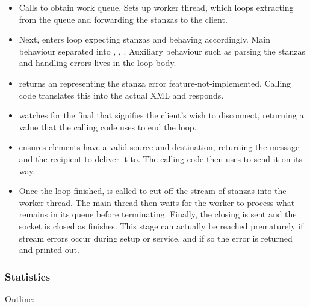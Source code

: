 \documentclass[12pt,a4paper,twoside,openright]{report}
\begin{document}
{\begin{itemize}
  \item Calls  to obtain work queue. Sets up worker thread, which loops extracting from the queue and forwarding the stanzas to the client.

  \item Next, enters loop expecting stanzas and behaving accordingly. Main behaviour separated into , , . Auxiliary behaviour such as parsing the stanzas and handling errors lives in the loop body.

  \item {} returns an  representing the stanza error feature-not-implemented. Calling code translates this into the actual XML and responds.

  \item {} watches for the final  that signifies the client's wish to disconnect, returning a value that the calling code uses to end the loop.

  \item {} ensures  elements have a valid source and destination, returning the message and the recipient to deliver it to. The calling code then uses  to send it on its way.

  \item Once the loop finished,  is called to cut off the stream of stanzas into the worker thread. The main thread then waits for the worker to process what remains in its queue before terminating. Finally, the closing  is sent and the socket is closed as  finishes. This stage can actually be reached prematurely if stream errors occur during setup or service, and if so the error is returned and printed out.
\end{itemize}

\subsubsection{Statistics}
Outline:

}
\end{document}
